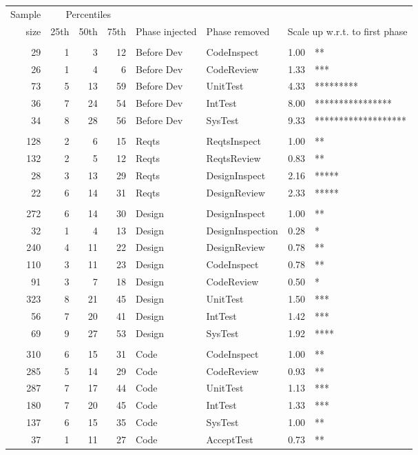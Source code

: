 \documentclass{sig-alternate}
\def\baselinestretch{1}
\begin{document}
\begin{figure}[!t] 
 \renewcommand{\baselinestretch}{0.7}
 \scriptsize
\begin{center}
\begin{tabular}{r|rrr|ll|rl}
  Sample&\multicolumn{3}{c|}{Percentiles}\\ 
size & 25th & 50th & 75th & Phase injected & Phase removed & \multicolumn{2}{l}{Scale up w.r.t. to first phase}\\\hline
\\
  29 &     1 &     3 &    12 & Before Dev & CodeInspect  & 1.00  &  **  \\
  26 &     1 &     4 &     6 & Before Dev & CodeReview  & 1.33  &  ***  \\
  73 &     5 &    13 &    59 & Before Dev & UnitTest  & 4.33  &  *********  \\
  36 &     7 &    24 &    54 & Before Dev & IntTest  & 8.00  &  ****************  \\
  34 &     8 &    28 &    56 & Before Dev & SysTest  & 9.33  &  *******************  \\\hline
\\
128 &     2 &     6 &    15 & Reqts & ReqtsInspect  & 1.00  &  **  \\
132 &     2 &     5 &    12 & Reqts & ReqtsReview  & 0.83  &  **  \\
 28 &     3 &    13 &    29 & Reqts & DesignInspect  & 2.16  &  *****  \\
 22 &     6 &    14 &    31 & Reqts & DesignReview  & 2.33  &  *****  \\\hline
\\
272 &     6 &    14 &    30 & Design & DesignInspect  & 1.00  &  **  \\
 32 &     1 &     4 &    13 & Design & DesignInspection  & 0.28  &  *  \\
240 &     4 &    11 &    22 & Design & DesignReview  & 0.78  &  **  \\
110 &     3 &    11 &    23 & Design & CodeInspect  & 0.78  &  **  \\
 91 &     3 &     7 &    18 & Design & CodeReview  & 0.50  &  *  \\
323 &     8 &    21 &    45 & Design & UnitTest  & 1.50  &  ***  \\
 56 &     7 &    20 &    41 & Design & IntTest  & 1.42  &  ***  \\
 69 &     9 &    27 &    53 & Design & SysTest  & 1.92  &  ****  \\\hline
\\
310 &     6 &    15 &    31 & Code & CodeInspect  & 1.00  &  **  \\
285 &     5 &    14 &    29 & Code & CodeReview  & 0.93  &  **  \\
287 &     7 &    17 &    44 & Code & UnitTest  & 1.13  &  ***  \\
180 &     7 &    20 &    45 & Code & IntTest  & 1.33  &  ***  \\
137 &     6 &    15 &    35 & Code & SysTest  & 1.00  &  **  \\
 37 &     1 &    11 &    27 & Code & AcceptTest  & 0.73  &  **  \\


\end{tabular}
\end{center}
\end{figure}
\end{document}
